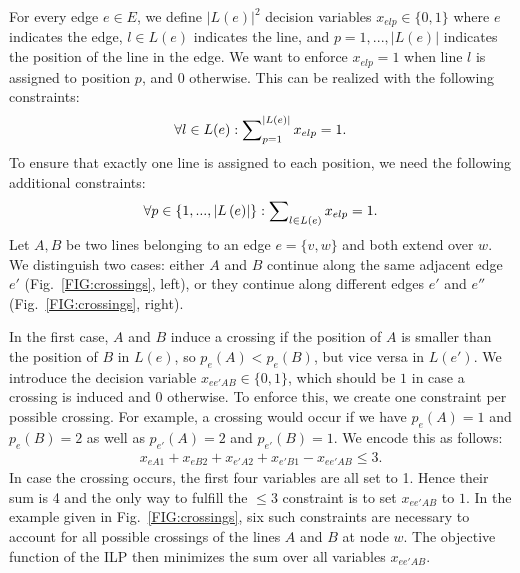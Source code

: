 \documentclass[format=acmsmall, review=false, screen=true]{acmart}
\begin{document}
For every edge $e \in E$, we define $\left|L\left(e\right)\right|^{2}$ decision variables $x_{elp} \in \{0,1\}$ where $e$ indicates the edge, $l \in L(e)$ indicates the line, and $p=1, ..., \left|L\left(e\right)\right|$ indicates the position of the line in the edge. We want to enforce $x_{elp}=1$ when line $l$ is assigned to position $p$, and $0$ otherwise. This can be realized with the following constraints:
\begin{equation}
\forall l \in L(e): \sum\nolimits_{p=1}^{|L(e)|} x_{elp}=1.  \label{EQ:p_constr1_bl}
\end{equation}
%
To ensure that exactly one line is assigned to each position, we need the following additional constraints:
%
\begin{equation}
	\forall p \in  \left\{1,...,\left|L\left(e\right)\right|\right\} : \sum\nolimits_{l \in L(e)} x_{elp} = 1. \label{EQ:p_constr2_bl}
\end{equation}%
Let $A, B$ be two lines belonging to an edge $e = \{v,w\}$ and both extend over $w$.
We distinguish two cases: either $A$ and $B$ continue along the same adjacent edge $e'$ (Fig.~\ref{FIG:crossings}, left), or they continue along different edges $e'$ and $e''$ (Fig.~\ref{FIG:crossings}, right).

In the first case, $A$ and $B$ induce a crossing if the position of $A$ is smaller than the position of $B$ in $L(e)$, so $p_e(A) < p_e(B)$, but vice versa in $L(e')$. We introduce the decision variable $x_{ee'AB} \in \{0,1\}$, which should be $1$ in case a crossing is induced and $0$ otherwise. To enforce this, we create one constraint per possible crossing. For example, a crossing would occur if we have $p_e(A)=1$ and $p_e(B)=2$ as well as $p_{e'}(A)=2$ and $p_{e'}(B) =1$. We encode this as follows:
\begin{align}
	x_{eA1} + x_{eB2} + x_{e'A2} + x_{e'B1} - x_{ee'AB} \leq 3  \label{EQ:crossdec_constr_bl}.
\end{align}
In case the crossing occurs, the first four variables are all set to 1. Hence their sum is 4 and the only way to fulfill the $\leq 3$ constraint is to set $x_{ee'AB}$ to $1$. In the example given in Fig.~\ref{FIG:crossings}, six such constraints are necessary to account for all possible crossings of the lines $A$ and $B$ at node $w$.
The objective function of the ILP then minimizes the sum over all variables $x_{ee'AB}$.
\end{document}
